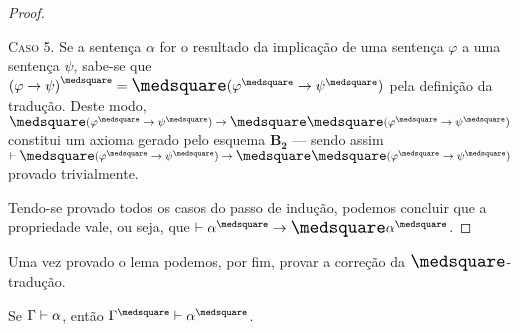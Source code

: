 \begin{lemma}
\begin{proof}
            \begin{case}
                \textsc{Caso 5.}
                Se a sentença $\alpha$ for o resultado da implicação de uma sentença $\varphi$ a uma sentença $\psi$, sabe-se que ${(\varphi\to\psi)}^\medsquare=\nec(\varphi^\medsquare\to\psi^\medsquare)$ pela definição da tradução.
                Deste modo, $\nec(\varphi^\medsquare\to\psi^\medsquare)\to\nec\nec(\varphi^\medsquare\to\psi^\medsquare)$ constitui um axioma gerado pelo esquema \hyperref[MB2]{$\mathbf{B_2}$} --- sendo assim $\entails\nec(\varphi^\medsquare\to\psi^\medsquare)\to\nec\nec(\varphi^\medsquare\to\psi^\medsquare)$ provado trivialmente.
            \end{case}
            \vspace{.5\baselineskip}
            Tendo-se provado todos os casos do passo de indução, podemos concluir que a propriedade vale, ou seja, que $\entails\alpha^\medsquare\to\nec\alpha^\medsquare$.
        \end{proof}
    \end{lemma}

    Uma vez provado o lema podemos, por fim, provar a correção da $\nec$-tradução.

    \begin{theorem}\label{square-correctness}
        Se $\Gamma\mathrel{\vdash}\alpha$, então $\Gamma^\medsquare\entails\alpha^\medsquare$.
    \end{theorem}

